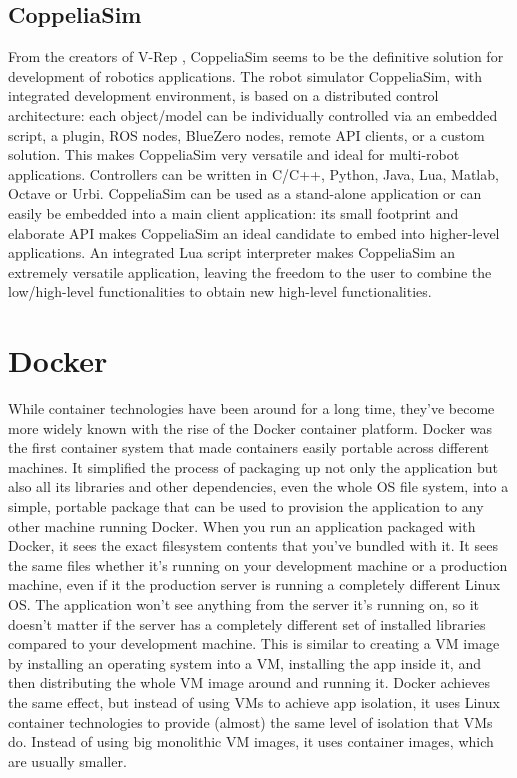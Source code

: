 
\subsection{CoppeliaSim}
From the creators of V-Rep \cite{VREP}, CoppeliaSim \cite{coppeliaSim} seems to be the definitive solution for development of robotics applications.
The robot simulator CoppeliaSim, with integrated development environment, is based on a distributed control architecture: each object/model can be individually controlled via an embedded script, a plugin, ROS nodes, BlueZero nodes, remote API clients, or a custom solution. This makes CoppeliaSim very versatile and ideal for multi-robot applications. Controllers can be written in C/C++, Python, Java, Lua, Matlab, Octave or Urbi.
CoppeliaSim can be used as a stand-alone application or can easily be embedded into a main client application: its small footprint and elaborate API makes CoppeliaSim an ideal candidate to embed into higher-level applications. An integrated Lua script interpreter makes CoppeliaSim an extremely versatile application, leaving the freedom to the user to combine the low/high-level functionalities to obtain new high-level functionalities.




\section{Docker} %
While container technologies have been around for a long time, they’ve become more widely known with the rise of the Docker container platform. Docker was the first container system that made containers easily portable across different machines. It simplified the process of packaging up not only the application but also all its libraries and other dependencies, even the whole OS file system, into a simple, portable package that can be used to provision the application to any other machine running Docker. When you run an application packaged with Docker, it sees the exact filesystem contents that you’ve bundled with it. It sees the same files whether it’s running on your development machine or a production machine, even if it the production server is running a completely different Linux OS. The application won’t see anything from the server it’s running on, so it doesn't matter if the server has a completely different set of installed libraries compared to your development machine.
This is similar to creating a VM image by installing an operating system into a VM, installing the app inside it, and then distributing the whole VM image around and running it. Docker achieves the same effect, but instead of using VMs to achieve app isolation, it uses Linux container technologies to provide (almost) the same level of isolation that VMs do. Instead of using big monolithic VM images, it uses container images, which are usually smaller.


